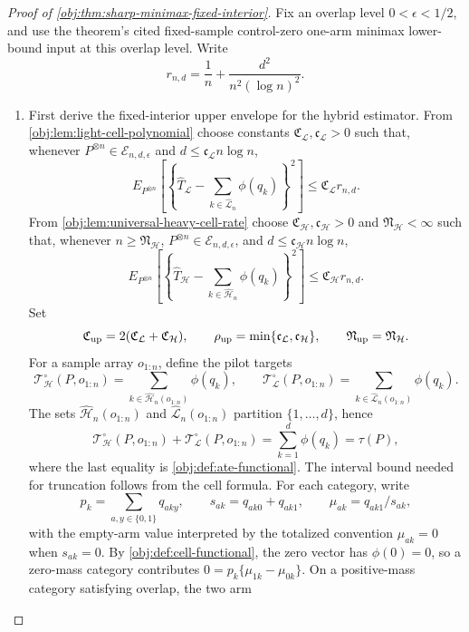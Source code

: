 \documentclass[11pt]{article}
\begin{document}
\begin{proof}[Proof of \cref{obj:thm:sharp-minimax-fixed-interior}]
Fix an overlap level \(0<\epsilon<1/2\), and use the theorem's cited fixed-sample control-zero one-arm minimax lower-bound input at this overlap level.  Write
\[
r_{n,d}=\frac1n+\frac{d^2}{n^2(\log n)^2}.
\]
\begin{enumerate}
\item First derive the fixed-interior upper envelope for the hybrid estimator.  From
\cref{obj:lem:light-cell-polynomial} choose constants
\(\mathfrak C_{\mathcal L},\mathfrak c_{\mathcal L}>0\) such that, whenever
\(P^{\otimes n}\in\mathcal E_{n,d,\epsilon}\) and
\(d\le \mathfrak c_{\mathcal L}n\log n\),
\[
E_{P^{\otimes n}}\!\left[
\left\{
\widehat T_{\mathcal L}
-
\sum_{k\in\widehat{\mathcal L}_n}\phi(q_k)
\right\}^2
\right]
\le
\mathfrak C_{\mathcal L} r_{n,d}.
\]
From \cref{obj:lem:universal-heavy-cell-rate} choose
\(\mathfrak C_{\mathcal H},\mathfrak c_{\mathcal H}>0\) and
\(\mathfrak N_{\mathcal H}<\infty\) such that, whenever
\(n\ge\mathfrak N_{\mathcal H}\), \(P^{\otimes n}\in\mathcal E_{n,d,\epsilon}\), and
\(d\le \mathfrak c_{\mathcal H}n\log n\),
\[
E_{P^{\otimes n}}\!\left[
\left\{
\widehat T_{\mathcal H}
-
\sum_{k\in\widehat{\mathcal H}_n}\phi(q_k)
\right\}^2
\right]
\le
\mathfrak C_{\mathcal H} r_{n,d}.
\]
Set
\[
\mathfrak C_{\rm up}=2(\mathfrak C_{\mathcal L}+\mathfrak C_{\mathcal H}),
\qquad
\mathfrak\rho_{\rm up}=\min\{\mathfrak c_{\mathcal L},\mathfrak c_{\mathcal H}\},
\qquad
\mathfrak N_{\rm up}=\mathfrak N_{\mathcal H}.
\]
For a sample array \(o_{1:n}\), define the pilot targets
\[
\mathcal T_{\mathcal H}^{\circ}(P,o_{1:n})
=
\sum_{k\in\widehat{\mathcal H}_n(o_{1:n})}\phi(q_k),
\qquad
\mathcal T_{\mathcal L}^{\circ}(P,o_{1:n})
=
\sum_{k\in\widehat{\mathcal L}_n(o_{1:n})}\phi(q_k).
\]
The sets \(\widehat{\mathcal H}_n(o_{1:n})\) and \(\widehat{\mathcal L}_n(o_{1:n})\) partition \(\{1,\ldots,d\}\), hence
\[
\mathcal T_{\mathcal H}^{\circ}(P,o_{1:n})
+
\mathcal T_{\mathcal L}^{\circ}(P,o_{1:n})
=
\sum_{k=1}^d\phi(q_k)
=
\tau(P),
\]
where the last equality is \cref{obj:def:ate-functional}.
The interval bound needed for truncation follows from the cell formula.  For each category, write
\[
p_k=\sum_{a,y\in\{0,1\}}q_{aky},
\qquad
s_{ak}=q_{ak0}+q_{ak1},
\qquad
\mu_{ak}=q_{ak1}/s_{ak},
\]
with the empty-arm value interpreted by the totalized convention \(\mu_{ak}=0\) when
\(s_{ak}=0\).  By \cref{obj:def:cell-functional}, the zero vector has
\(\phi(0)=0\), so a zero-mass category contributes
\(0=p_k\{\mu_{1k}-\mu_{0k}\}\).  On a positive-mass category satisfying overlap, the two arm

\end{enumerate}
\end{proof}
\end{document}
